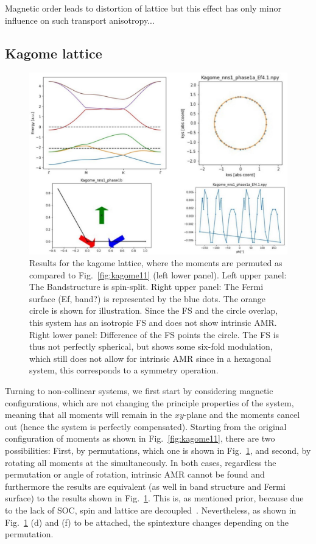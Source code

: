 \documentclass[prb,showpacs,amsmath,amssymb,superscriptaddress,twocolumn,floatfix]{revtex4-1}
\begin{document}
Magnetic order leads to distortion of lattice but this effect has only
minor influence on such transport anisotropy...


\subsection{Kagome lattice}

\begin{figure}
	\centering
	\includegraphics[width=0.7\linewidth]{img_total/total_Kagome_phase1a}
	\caption{Results for the kagome lattice, where the moments are permuted as compared to Fig.~\ref{fig:kagome11} (left lower panel). Left upper panel: The Bandstructure is spin-split. Right upper panel: The Fermi surface {\color{red} (Ef, band?)} is represented by the blue dots. The orange circle is shown for illustration. Since the FS and the circle overlap, this system has an isotropic FS and does not show intrinsic AMR. Right lower panel: Difference of the FS points the circle. The FS is thus not perfectly spherical, but shows some six-fold modulation, which still does not allow for intrinsic AMR since in a hexagonal system, this corresponds to a symmetry operation.}
	\label{fig:totalkagomephase1a}
\end{figure}


Turning to non-collinear systems, we
first start by considering magnetic configurations, which are not changing the principle properties of the system, meaning that all moments will remain in the $xy$-plane and the moments cancel out (hence the system is perfectly compensated). Starting from the original configuration of moments as shown in Fig.~\ref{fig:kagome11}, there are two possibilities: First, by permutations, which one is shown in Fig.~\ref{fig:totalkagomephase1a}, and second, by rotating all moments at the simultaneously. In both cases, regardless the permutation or angle of rotation, intrinsic AMR cannot be found and furthermore the results are equivalent (as well in band structure and Fermi surface) to the results shown in Fig.~\ref{fig:totalkagomephase1a}. This is, as mentioned prior, because due to the lack of SOC, spin and lattice are decoupled~\cite{Gonzalez-Hernandez:2024}. Nevertheless, as shown in Fig.~\ref{fig:totalkagomephase1a} (d) and (f) {\color{red} to be attached}, the spintexture changes depending on the permutation. 
\end{document}
